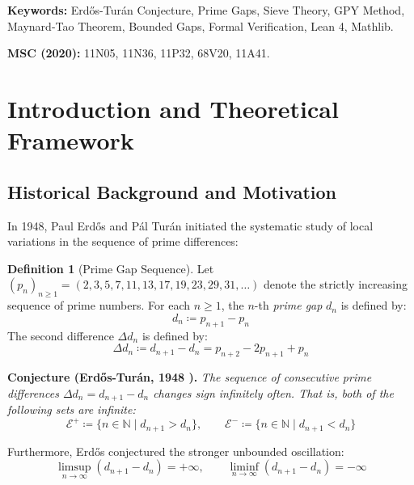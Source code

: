 \documentclass[11pt,a4paper]{article}
\theoremstyle{definition}
\newtheorem{definition}[theorem]{Definition}
\begin{document}
\vspace{0.5em}
\noindent\textbf{Keywords:} Erd\H{o}s-Tur\'an Conjecture, Prime Gaps, Sieve Theory, GPY Method, Maynard-Tao Theorem, Bounded Gaps, Formal Verification, Lean 4, Mathlib.

\noindent\textbf{MSC (2020):} 11N05, 11N36, 11P32, 68V20, 11A41.

\tableofcontents
\newpage

\section{Introduction and Theoretical Framework}

\subsection{Historical Background and Motivation}
In 1948, Paul Erd\H{o}s and P\'al Tur\'an \cite{erdos_turan1948} initiated the systematic study of local variations in the sequence of prime differences:

\begin{definition}[Prime Gap Sequence]\label{def:prime_gaps}
Let $(p_n)_{n \ge 1} = (2, 3, 5, 7, 11, 13, 17, 19, 23, 29, 31, \dots)$ denote the strictly increasing sequence of prime numbers.
For each $n \ge 1$, the $n$-th \emph{prime gap} $d_n$ is defined by:
\begin{equation}\label{eq:prime_gap_def}
d_n \coloneqq p_{n+1} - p_n
\end{equation}
The second difference $\Delta d_n$ is defined by:
\begin{equation}\label{eq:second_diff_def}
\Delta d_n \coloneqq d_{n+1} - d_n = p_{n+2} - 2 p_{n+1} + p_n
\end{equation}
\end{definition}

\noindent\textbf{Conjecture (Erd\H{o}s-Tur\'an, 1948 \cite{erdos_turan1948}).} \textit{The sequence of consecutive prime differences $\Delta d_n = d_{n+1} - d_n$ changes sign infinitely often. That is, both of the following sets are infinite:}
\begin{equation}\label{eq:et_conj_sets}
\mathcal{E}^+ \coloneqq \{ n \in \mathbb{N} \mid d_{n+1} > d_n \}, \qquad \mathcal{E}^- \coloneqq \{ n \in \mathbb{N} \mid d_{n+1} < d_n \}
\end{equation}

Furthermore, Erd\H{o}s conjectured the stronger unbounded oscillation:
\begin{equation}\label{eq:et_unbounded}
\limsup_{n \to \infty} (d_{n+1} - d_n) = +\infty, \qquad \liminf_{n \to \infty} (d_{n+1} - d_n) = -\infty
\end{equation}
\end{document}
